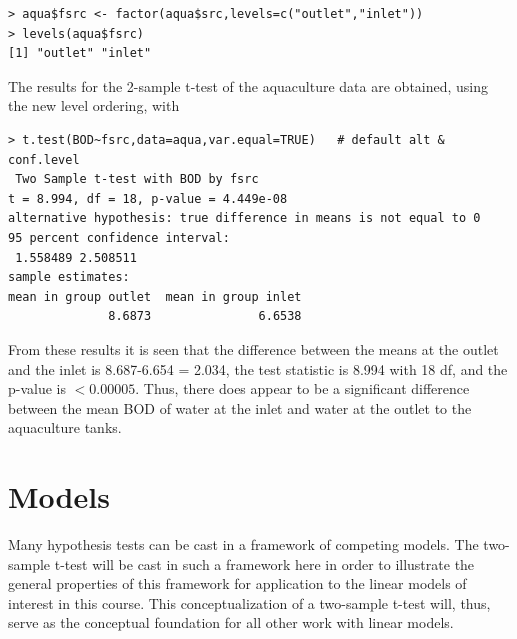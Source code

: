 \documentclass[10pt,openany]{book}\usepackage[]{graphicx}\usepackage[]{color}
\makeatletter
\newenvironment{kframe}{%
 \def\at@end@of@kframe{}%
 \ifinner\ifhmode%
  \def\at@end@of@kframe{\end{minipage}}%
  \begin{minipage}{\columnwidth}%
 \fi\fi%
 \def\FrameCommand##1{\hskip\@totalleftmargin \hskip-\fboxsep
 \colorbox{shadecolor}{##1}\hskip-\fboxsep
     \hskip-\linewidth \hskip-\@totalleftmargin \hskip\columnwidth}%
 \MakeFramed {\advance\hsize-\width
   \@totalleftmargin\z@ \linewidth\hsize
   \@setminipage}}%
 {\par\unskip\endMakeFramed%
 \at@end@of@kframe}
\newenvironment{knitrout}{}{} %
\makeatother
\begin{document}
\begin{knitrout}
\color{fgcolor}\begin{kframe}
\begin{verbatim}
> aqua$fsrc <- factor(aqua$src,levels=c("outlet","inlet"))
> levels(aqua$fsrc)
[1] "outlet" "inlet" 
\end{verbatim}
\end{kframe}
\end{knitrout}

The results for the 2-sample t-test of the aquaculture data are obtained, using the new level ordering, with

\begin{knitrout}
\color{fgcolor}\begin{kframe}
\begin{verbatim}
> t.test(BOD~fsrc,data=aqua,var.equal=TRUE)   # default alt & conf.level
 Two Sample t-test with BOD by fsrc 
t = 8.994, df = 18, p-value = 4.449e-08
alternative hypothesis: true difference in means is not equal to 0 
95 percent confidence interval:
 1.558489 2.508511 
sample estimates:
mean in group outlet  mean in group inlet 
              8.6873               6.6538 
\end{verbatim}
\end{kframe}
\end{knitrout}

From these results it is seen that the difference between the means at the outlet and the inlet is 8.687-6.654 = 2.034, the test statistic is 8.994 with 18 df, and the p-value is $<0.00005$.  Thus, there does appear to be a significant difference between the mean BOD of water at the inlet and water at the outlet to the aquaculture tanks.


\section{Models}
Many hypothesis tests can be cast in a framework of competing models.  The two-sample t-test will be cast in such a framework here in order to illustrate the general properties of this framework for application to the linear models of interest in this course.  This conceptualization of a two-sample t-test will, thus, serve as the conceptual foundation for all other work with linear models.
\end{document}
